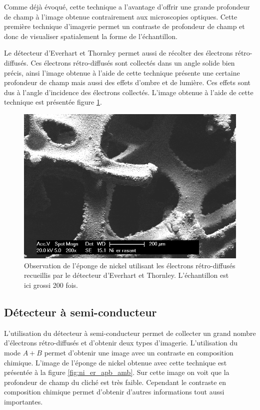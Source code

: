 \documentclass[a4paper,12pt]{article}
\newcommand\ett{Everhart et Thornley\xspace}
\begin{document}
Comme déjà évoqué,
cette technique a l'avantage d'offrir une grande profondeur de champ à l'image obtenue contrairement aux microscopies optiques. Cette première technique d'imagerie permet un contraste de profondeur de champ et donc de visualiser spatialement la forme de l'échantillon.

Le détecteur d'\ett permet aussi de récolter des électrons rétro-diffusés. Ces électrons rétro-diffusés sont
collectés dans un angle solide bien précis, ainsi l'image obtenue à l'aide de cette technique présente une
certaine profondeur de champ mais aussi des effets d'ombre et de lumière. Ces effets sont dus à l'angle
d'incidence des électrons collectés. L'image obtenue à l'aide de cette technique est présentée figure
\ref{fig:ni_er_rasant}.

\begin{figure}[h!]
\centering
\includegraphics[width = 0.7 \textwidth]{images/ni_er_rasant.png}
\caption{Observation de l'éponge de nickel utilisant les électrons rétro-diffusés recueillis par le détecteur d'\ett. L'échantillon est ici grossi 200 fois.}
\label{fig:ni_er_rasant}
\end{figure}

\clearpage

\subsection{Détecteur à semi-conducteur}

L'utilisation du détecteur à semi-conducteur permet de collecter un grand nombre d'électrons rétro-diffusés
et d'obtenir deux types d'imagerie. L'utilisation du mode $A+B$ permet d'obtenir une image avec un contraste
en composition chimique. L'image de l'éponge de nickel obtenue avec cette technique est présentée à la figure
\ref{fig:ni_er_apb_amb}. Sur cette image on voit que la profondeur de champ du cliché est très faible. Cependant
le contraste en composition chimique permet d'obtenir d'autres informations tout aussi importantes.
\end{document}
